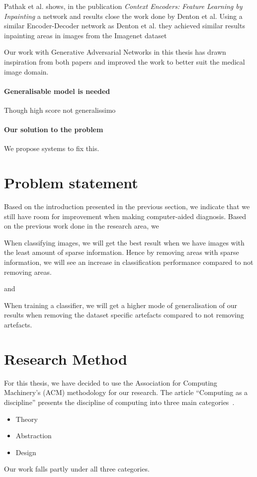 Pathak et al. shows, in the publication \textit{Context Encoders: Feature Learning by Inpainting} a network and results close the work done by Denton et al. Using a similar Encoder-Decoder network as Denton et al. they achieved similar results inpainting areas in images from the Imagenet dataset

Our work with Generative Adversarial Networks in this thesis has drawn inspiration from both papers and improved the work to better suit the medical image domain.
\fi


\paragraph{Generalisable model is needed}
Though high score not generalissimo

\paragraph{Our solution to the problem}
We propose systems to fix this. 
    
    
\section{Problem statement}
\label{cha:problemstatement}
Based on the introduction presented in the previous section, we indicate that we still have room for improvement when making computer-aided diagnosis. 
Based on the previous work done in the research area, we 


\noindent
\begin{hyp} \label{hyp:a}
When classifying images, we will get the best result when we have images with the least amount of sparse information. 
Hence by removing areas with sparse information,
we will see an increase in classification performance compared to not removing areas.
\end{hyp}

\noindent
and

\noindent 
\begin{hyp} \label{hyp:b}
When training a classifier, we will get a higher
mode of generalisation of our results when removing the dataset
specific artefacts compared to not removing artefacts.
\end{hyp}
\vspace{5px}


\section{Research Method}
For this thesis, we have decided to use the Association for Computing Machinery's (ACM) methodology for our research. The article ``Computing as a discipline'' presents the discipline of computing into three main categories~\cite{Denning:1989:CD:63238.63239}. 
\begin{itemize}
\item Theory
\item Abstraction
\item Design
\end{itemize}
Our work falls partly under all three categories.

